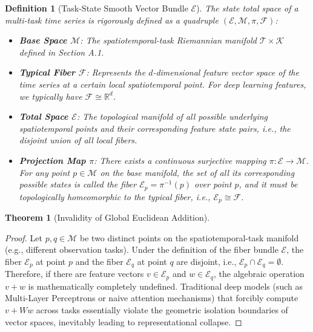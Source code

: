 \documentclass{article}
\newtheorem{definition}{Definition}[section]
\newtheorem{theorem}{Theorem}[section]
\begin{document}
\begin{definition}[Task-State Smooth Vector Bundle $\mathcal{E}$]
The state total space of a multi-task time series is rigorously defined as a quadruple $(\mathcal{E}, \mathcal{M}, \pi, \mathcal{F})$:
\begin{itemize}
    \item \textbf{Base Space $\mathcal{M}$}: The spatiotemporal-task Riemannian manifold $\mathcal{T} \times \mathcal{K}$ defined in Section A.1.
    \item \textbf{Typical Fiber $\mathcal{F}$}: Represents the $d$-dimensional feature vector space of the time series at a certain local spatiotemporal point. For deep learning features, we typically have $\mathcal{F} \cong \mathbb{R}^d$.
    \item \textbf{Total Space $\mathcal{E}$}: The topological manifold of all possible underlying spatiotemporal points and their corresponding feature state pairs, i.e., the disjoint union of all local fibers.
    \item \textbf{Projection Map $\pi$}: There exists a continuous surjective mapping $\pi: \mathcal{E} \to \mathcal{M}$. For any point $p \in \mathcal{M}$ on the base manifold, the set of all its corresponding possible states is called the fiber $\mathcal{E}_p = \pi^{-1}(p)$ over point $p$, and it must be topologically homeomorphic to the typical fiber, i.e., $\mathcal{E}_p \cong \mathcal{F}$.
\end{itemize}
\end{definition}

\begin{theorem}[Invalidity of Global Euclidean Addition]
\hfill
\end{theorem}

\begin{proof}
Let $p, q \in \mathcal{M}$ be two distinct points on the spatiotemporal-task manifold (e.g., different observation tasks). Under the definition of the fiber bundle $\mathcal{E}$, the fiber $\mathcal{E}_p$ at point $p$ and the fiber $\mathcal{E}_q$ at point $q$ are disjoint, i.e., $\mathcal{E}_p \cap \mathcal{E}_q = \emptyset$. Therefore, if there are feature vectors $v \in \mathcal{E}_p$ and $w \in \mathcal{E}_q$, the algebraic operation $v + w$ is mathematically completely undefined. Traditional deep models (such as Multi-Layer Perceptrons or naive attention mechanisms) that forcibly compute $v + W w$ across tasks essentially violate the geometric isolation boundaries of vector spaces, inevitably leading to representational collapse.
\end{proof}
\end{document}

